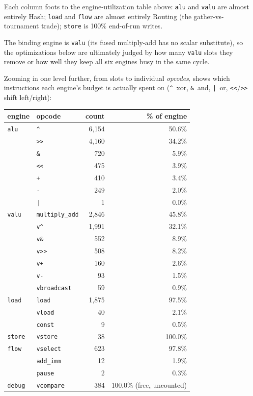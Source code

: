 \documentclass[11pt]{article}
\newcommand{\code}[1]{\texttt{#1}}
\begin{document}
\noindent Each column foots to the engine-utilization table above:
\code{alu} and \code{valu} are almost entirely Hash; \code{load} and
\code{flow} are almost entirely Routing (the gather-vs-tournament trade);
\code{store} is 100\% end-of-run writes.

The binding engine is \code{valu} (its fused multiply-add has no scalar
substitute), so the optimizations below are ultimately judged by how many
\code{valu} slots they remove or how well they keep all six engines busy in
the same cycle.

\noindent Zooming in one level further, from slots to individual
\emph{opcodes}, shows which instructions each engine's budget is actually
spent on (\code{\^{}}~xor, \code{\&}~and, \code{|}~or, \code{<<}/\code{>>}
shift left/right):

\begin{center}
\begin{tabular}{llrr}
\toprule
engine & opcode & count & \% of engine \\
\midrule
\code{alu}
  & \code{\^{}}          & 6{,}154 & 50.6\% \\
  & \code{>>}            & 4{,}160 & 34.2\% \\
  & \code{\&}            &   720   &  5.9\% \\
  & \code{<<}            &   475   &  3.9\% \\
  & \code{+}             &   410   &  3.4\% \\
  & \code{-}             &   249   &  2.0\% \\
  & \code{|}             &     1   &  0.0\% \\
\midrule
\code{valu}
  & \code{multiply\_add} & 2{,}846 & 45.8\% \\
  & \code{v\^{}}         & 1{,}991 & 32.1\% \\
  & \code{v\&}           &   552   &  8.9\% \\
  & \code{v>>}           &   508   &  8.2\% \\
  & \code{v+}            &   160   &  2.6\% \\
  & \code{v-}            &    93   &  1.5\% \\
  & \code{vbroadcast}    &    59   &  0.9\% \\
\midrule
\code{load}
  & \code{load}          & 1{,}875 & 97.5\% \\
  & \code{vload}         &    40   &  2.1\% \\
  & \code{const}         &     9   &  0.5\% \\
\midrule
\code{store}
  & \code{vstore}        &    38   & 100.0\% \\
\midrule
\code{flow}
  & \code{vselect}       &   623   & 97.8\% \\
  & \code{add\_imm}      &    12   &  1.9\% \\
  & \code{pause}         &     2   &  0.3\% \\
\midrule
\code{debug} & \code{vcompare} & 384 & 100.0\% (free, uncounted) \\
\bottomrule
\end{tabular}
\end{center}
\end{document}
